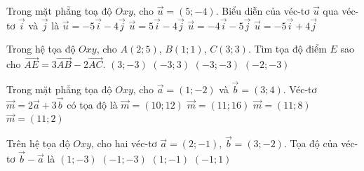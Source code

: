 \begin{ex}%
	Trong mặt phẳng toạ độ $Oxy$, cho $\overrightarrow{u}=(5;-4)$. Biểu diễn của véc-tơ $\overrightarrow{u}$ qua véc-tơ $\overrightarrow{i}$  và $\overrightarrow{j}$ là
	 \choice
		{$\overrightarrow{u}=-5\overrightarrow{i}-4\overrightarrow{j}$} 
		{\True $\overrightarrow{u}=5\overrightarrow{i}-4\overrightarrow{j}$} 
		 {$\overrightarrow{u}=-4\overrightarrow{i}-5\overrightarrow{j}$}
		{$\overrightarrow{u}=-5\overrightarrow{i}+4\overrightarrow{j}$} 
\end{ex}

\begin{ex}%
	Trong hệ tọa độ $Oxy$, cho $A(2; 5)$, $B(1; 1)$, $C(3; 3)$. Tìm tọa độ điểm $E$ sao cho $\overrightarrow{AE}=3  \overrightarrow{AB}-2 \overrightarrow{AC}$.
	\choice 
		 {$(3;-3)$}
		 {$(-3; 3)$}
		{\True  $(-3;-3)$}
		 {$(-2;-3)$}
\end{ex}

\begin{ex}%
	Trong mặt phẳng tọa độ $Oxy$,  cho $ \overrightarrow{a}=(1;-2) $ và $ \overrightarrow{b}=(3;4)$. Véc-tơ $ \overrightarrow{m}=2\overrightarrow{a}+3\overrightarrow{b} $ có tọa độ là
	\choice 
		{$  \overrightarrow{m}=(10;12) $}
		{$ \overrightarrow{m}=(11;16)  $}
		{\True $ \overrightarrow{m}=(11;8)  $}
		{$ \overrightarrow{m}=(11;2) $} 
\end{ex}

\begin{ex}%
	Trên hệ tọa độ $Oxy$, cho hai véc-tơ $\overrightarrow{a}=(2;-1)$, $\overrightarrow{b}=(3;-2)$. Tọa độ của  véc-tơ $\overrightarrow{b}-\overrightarrow{a}$ là
	\choice 
		{$(1;-3)$} 
		{$(-1;-3)$} 
		{\True $(1;-1)$} 
		{$(-1;1)$} 
\end{ex}

